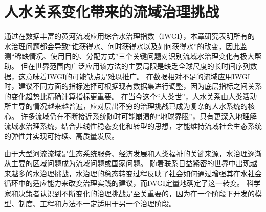 \section{人\textendash{}水关系变化带来的流域治理挑战}

通过在数据丰富的黄河流域应用综合水治理指数（IWGI），本章研究表明所有的水治理问题都会导致“谁获得水、何时获得水以及如何获得水”的改变，因此监测“稀缺情况、使用目的、分配方式”三个关键问题对识别流域水治理变化有极大帮助。
但在世界范围内广泛应用该方法的主要局限是缺乏全球尺度的长时间序列数据，这意味着IWGI的可能缺点是难以推广。
在数据相对不足的流域应用IWGI时，建议不同方面的指标选择可根据现有数据集进行调整，因为底层指标之间关系的变化趋势比精确计算指标更重要。
在当今这个“人类世”，人\textendash{}水关系由人类活动所主导的情况越来越普遍，应对层出不穷的治理挑战已成为复杂的人\textendash{}水系统的核心\cite{cumming2018,cumming2014,jaeger2019}。
许多流域仍在不断接近系统随时可能崩溃的“地球界限”\cite{gleeson2020, wang-erlandsson2022}，只有更深入地理解流域水治理系统，结合非线性稳态变化和转型的思想，才能维持流域社会\textendash{}生态系统的弹性并实现可持续、高质量发展\cite{falkenmark2019}。

由于大型河流流域是生态系统服务、经济发展和人类福祉的关键来源，水治理逐渐从主要的区域问题成为流域问题或国家问题\cite{best2019,best2020}。
随着联系日益紧密的世界中出现越来越多的水治理挑战，水治理的稳态转变过程反映了社会如何通过增强其在水社会循环中的适应能力来改变治理实践的建议，而IWGI定量地确定了这一转变\cite{loch2020,turton1999,diaz2019}。
科学家和决策者认识到不断变化的治理挑战是至关重要的，因为在一个阶段下开发的模型、制度、工程和方法不一定适用于另一个治理阶段\cite{reyers2018}。
